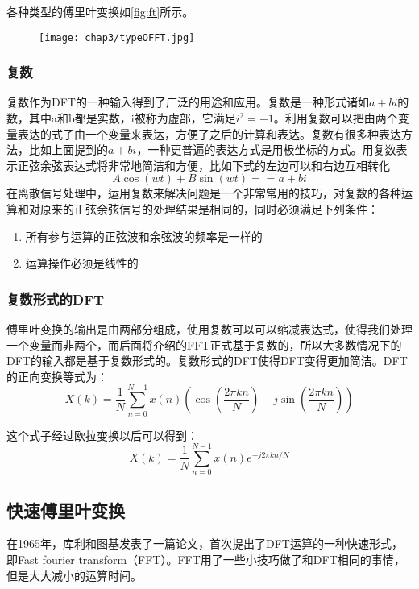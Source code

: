 各种类型的傅里叶变换如\ref{fig:ft}所示。

\begin{figure}[!h]
\centering
    \begin{minipage}[b]{1\textwidth}
    \captionstyle{\centering}
    \centering
    \texttt{[image: chap3/typeOFFT.jpg]}
    \end{minipage}     
\end{figure}

\subsubsection{复数}
复数作为DFT的一种输入得到了广泛的用途和应用。复数是一种形式诸如$a+bi$的数，其中a和b都是实数，i被称为虚部，它满足$i^2=-1$。利用复数可以把由两个变量表达的式子由一个变量来表达，方便了之后的计算和表达。复数有很多种表达方法，比如上面提到的$a+bi$，一种更普遍的表达方式是用极坐标的方式。用复数表示正弦余弦表达式将非常地简洁和方便，比如下式的左边可以和右边互相转化$$A\cos (wt) + B\sin (wt) == a + bi$$在离散信号处理中，运用复数来解决问题是一个非常常用的技巧，对复数的各种运算和对原来的正弦余弦信号的处理结果是相同的，同时必须满足下列条件：

\begin{enumerate}
\item 所有参与运算的正弦波和余弦波的频率是一样的
\item 运算操作必须是线性的
\end{enumerate}

\subsubsection{复数形式的DFT}
傅里叶变换的输出是由两部分组成，使用复数可以可以缩减表达式，使得我们处理一个变量而非两个，而后面将介绍的FFT正式基于复数的，所以大多数情况下的DFT的输入都是基于复数形式的。复数形式的DFT使得DFT变得更加简洁。DFT的正向变换等式为：$$X(k)=\frac{1}{N}\sum_{n=0}^{N-1}x(n)(\cos(\frac{2\pi kn}{N}) - j\sin(\frac{2\pi kn}{N}))$$

这个式子经过欧拉变换以后可以得到：$$X(k)=\frac{1}{N}\sum_{n=0}^{N-1}x(n)e^{-j2\pi kn/N}$$

\subsection{快速傅里叶变换}
\label{sec:FFT}

在1965年，库利和图基发表了一篇论文，首次提出了DFT运算的一种快速形式，即Fast fourier transform（FFT）。FFT用了一些小技巧做了和DFT相同的事情，但是大大减小的运算时间。

